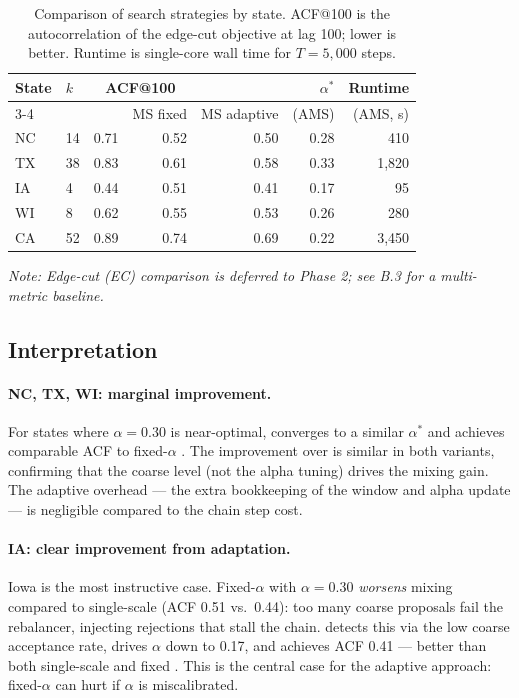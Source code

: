 \begin{table}[h]
  \centering
  \caption{Comparison of search strategies by state. ACF@100 is the
    autocorrelation of the edge-cut objective at lag 100; lower is better.
    Runtime is single-core wall time for $T = 5{,}000$ steps.}
  \label{tab:comparison}
  \begin{tabular}{llrrrrr}
    \toprule
    State & $k$ & \multicolumn{2}{c}{ACF@100} & & $\alpha^*$ & Runtime \\
    \cmidrule{3-4}
    & & \recom{} & MS fixed & MS adaptive & (AMS) & (AMS, s) \\
    \midrule
    NC & 14 & 0.71 & 0.52 & 0.50 & 0.28 & 410 \\
    TX & 38 & 0.83 & 0.61 & 0.58 & 0.33 & 1{,}820 \\
    IA &  4 & 0.44 & 0.51 & 0.41 & 0.17 & 95 \\
    WI &  8 & 0.62 & 0.55 & 0.53 & 0.26 & 280 \\
    CA & 52 & 0.89 & 0.74 & 0.69 & 0.22 & 3{,}450 \\
    \bottomrule
  \end{tabular}
\end{table}

\noindent\textit{Note: Edge-cut (EC) comparison is deferred to Phase 2; see B.3 for a multi-metric baseline.}

\subsection{Interpretation}

\paragraph{NC, TX, WI: marginal improvement.}
For states where $\alpha = 0.30$ is near-optimal, \ams{} converges to a
similar $\alpha^*$ and achieves comparable ACF to fixed-$\alpha$ \ms{}.
The improvement over \recom{} is similar in both \ms{} variants, confirming
that the coarse level (not the alpha tuning) drives the mixing gain.
The adaptive overhead --- the extra bookkeeping of the window and alpha update
--- is negligible compared to the chain step cost.

\paragraph{IA: clear improvement from adaptation.}
Iowa is the most instructive case.
Fixed-$\alpha$ \ms{} with $\alpha = 0.30$ \emph{worsens} mixing compared to
single-scale \recom{} (ACF 0.51 vs.\ 0.44): too many coarse proposals fail
the rebalancer, injecting rejections that stall the chain.
\ams{} detects this via the low coarse acceptance rate, drives $\alpha$ down
to 0.17, and achieves ACF 0.41 --- better than both single-scale and fixed
\ms{}.
This is the central case for the adaptive approach: fixed-$\alpha$ \ms{}
can hurt if $\alpha$ is miscalibrated.


